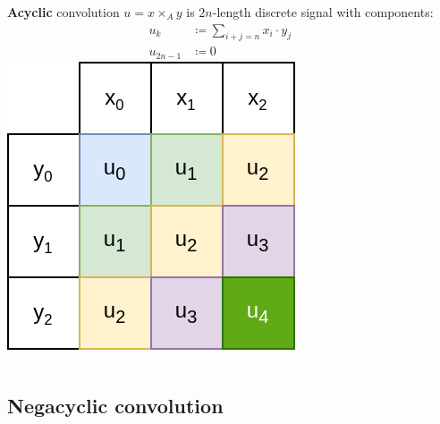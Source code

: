 \documentclass{beamer}
\begin{document}
\begin{frame}
		\frametitle{\secname}
		\framesubtitle{\subsecname}

 		\begin{columns}
				\textbf{Acyclic} convolution $u = x \times_A y$ is $2n$-length discrete
				signal with components:
				\begin{align*}
						u_k & \coloneqq \sum_{i + j = n} x_i \cdot y_j \\
						u_{2n - 1} & \coloneqq 0
				\end{align*}
 				\includegraphics[width=\textwidth]{../resources/acyclic_convolution.drawio.png}
		\end{columns}
\end{frame}

\subsection{Negacyclic convolution}
\end{document}
